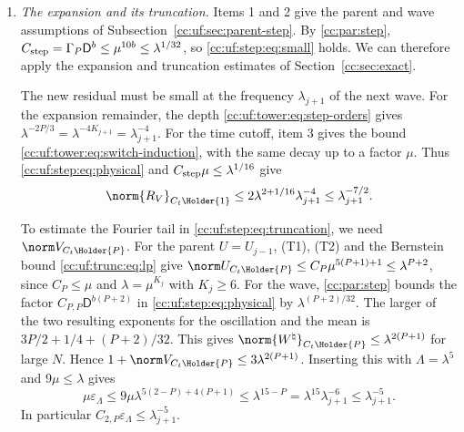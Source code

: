 \begin{enumerate}[leftmargin=*]
On the interval where the cutoff changes, \eqref{cc:uf:tower:eq:switch-small}
gives $\gamma\le e^{3-L_j}=e^3\lambda_{j+1}^{-4}$. Since
$|\widetilde\chi'|\le Cr$ and $Ce^3r\le\mu$ for large $N$ by item~2,
\begin{equation}\label{cc:uf:tower:eq:switch-induction}
 \|\widetilde\chi'\gamma\|_\infty\le\mu\lambda_{j+1}^{-4}.
\end{equation}
The same estimate holds for the first wave since $\widetilde\chi_1'\equiv0$.

\item \emph{The expansion and its truncation.}
Items 1 and 2 give the parent and wave assumptions of
Subsection~\ref{cc:uf:sec:parent-step}. By \eqref{cc:par:step},
$C_{\rm step}=\Gamma_P\mathsf D^b\le\mu^{10b}\le\lambda^{1/32}$,
so \eqref{cc:uf:step:eq:small} holds. We can therefore apply the
expansion and truncation estimates of Section~\ref{cc:sec:exact}.

The new residual must be small at the frequency $\lambda_{j+1}$ of the
next wave. For the expansion remainder, the depth
\eqref{cc:uf:tower:eq:step-orders} gives
$\lambda^{-2P/3}=\lambda^{-4K_{j+1}}=\lambda_{j+1}^{-4}$.
For the time cutoff, item 3 gives the bound
\eqref{cc:uf:tower:eq:switch-induction}, with the same decay up to a factor $\mu$. Thus
\eqref{cc:uf:step:eq:physical} and $C_{\rm step}\mu\le\lambda^{1/16}$ give
\begin{equation}\label{cc:uf:tower:eq:frequency}
 \norm{R_V}_{C_t\Holder{1}}\le2\lambda^{2+1/16}\lambda_{j+1}^{-4}
 \le\lambda_{j+1}^{-7/2}.
\end{equation}

To estimate the Fourier tail in \eqref{cc:uf:step:eq:truncation}, we
need $\norm V_{C_t\Holder{P}}$. For the parent $U=U_{j-1}$, (T1), (T2)
and the Bernstein bound \eqref{cc:uf:trunc:eq:lp} give
$\norm U_{C_t\Holder{P}}\le C_P\mu^{5(P+1)+1}\le\lambda^{P+2}$,
since $C_P\le\mu$ and $\lambda=\mu^{K_j}$ with $K_j\ge6$.
For the wave, \eqref{cc:par:step} bounds the factor
$C_{P,P}\mathsf D^{b(P+2)}$ in \eqref{cc:uf:step:eq:physical}
by $\lambda^{(P+2)/32}$. The larger of the two resulting exponents
for the oscillation and the mean is $3P/2+1/4+(P+2)/32$.
This gives $\norm{W^\natural}_{C_t\Holder{P}}\le\lambda^{2(P+1)}$
for large $N$. Hence $1+\norm V_{C_t\Holder{P}}\le3\lambda^{2(P+1)}$.
Inserting this with $\Lambda=\lambda^5$ and $9\mu\le\lambda$ gives
\begin{equation}\label{cc:uf:tower:eq:tail-small}
 \mu\varepsilon_\Lambda\le9\mu\lambda^{5(2-P)+4(P+1)}
 \le\lambda^{15-P}
 =\lambda^{15}\lambda_{j+1}^{-6}\le\lambda_{j+1}^{-5}.
\end{equation}
In particular $C_{2,P}\varepsilon_\Lambda\le\lambda_{j+1}^{-5}$.


\end{enumerate}
